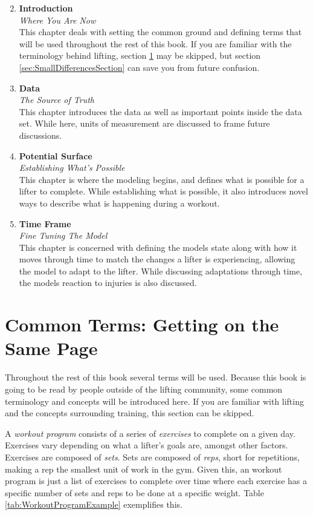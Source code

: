 \begin{enumerate}
    \setcounter{enumi}{1}
    \item \textbf{Introduction} \\ \textit{Where You Are Now} \\
    		This chapter deals with setting the common ground and defining terms that will be used throughout the rest of this book. If you are familiar with the terminology behind lifting, section \ref{sec:CommonTermsSection} may be skipped, but section \ref{sec:SmallDifferencesSection} can save you from future confusion.
    \item \textbf{Data} \\ \textit{The Source of Truth} \\
        This chapter introduces the data as well as important points inside the data set. While here, units of measurement are discussed to frame future discussions.
    \item \textbf{Potential Surface} \\ \textit{Establishing What's Possible} \\
        This chapter is where the modeling begins, and defines what is possible for a lifter to complete. While establishing what is possible, it also introduces novel ways to describe what is happening during a workout.
    \item \textbf{Time Frame} \\ \textit{Fine Tuning The Model} \\
        This chapter is concerned with defining the models state along with how it moves through time to match the changes a lifter is experiencing, allowing the model to adapt to the lifter. While discussing adaptations through time, the models reaction to injuries is also discussed.
\end{enumerate}

\section{Common Terms: Getting on the Same Page}
\label{sec:CommonTermsSection}

Throughout the rest of this book several terms will be used. Because this book is going to be read by people outside of the lifting community, some common terminology and concepts will be introduced here. If you are familiar with lifting and the concepts surrounding training, this section can be skipped.

A \textit{workout program} consists of a series of \textit{exercises} to complete on a given day. Exercises vary depending on what a lifter's goals are, amongst other factors. Exercises are composed of \textit{sets}. Sets are composed of \textit{reps}, short for repetitions, making a rep the smallest unit of work in the gym. Given this, an workout program is just a list of exercises to complete over time where each exercise has a specific number of sets and reps to be done at a specific weight. Table \ref{tab:WorkoutProgramExample} exemplifies this.

